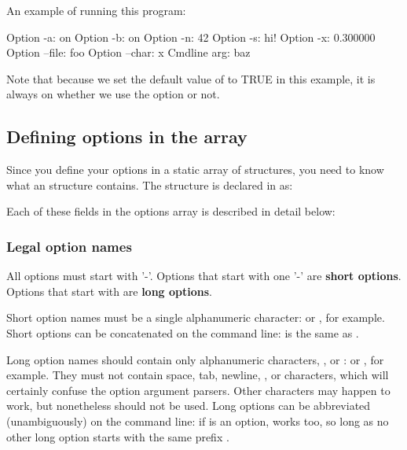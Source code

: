 An example of running this program:
\begin{cchunk}
  Option -a:      on
  Option -b:      on
  Option -n:      42
  Option -s:      hi!
  Option -x:      0.300000
  Option --file:  foo
  Option --char:  x
  Cmdline arg:    baz
\end{cchunk}

Note that because we set the default value of  to TRUE in
this example, it is always on whether we use the  option or
not.



\subsection{Defining options in the  array}

Since you define your options in a static array of
 structures, you need to know what an
 structure contains.  The 
structure is declared in  as:



Each of these fields in the options array is described in detail below:

   \subsubsection{Legal option names}

All options must start with '-'. Options that start with one '-' are
\textbf{short options}. Options that start with \ccode{--} are
\textbf{long options}.

Short option names must be a single alphanumeric character: 
or , for example.  Short options can be concatenated on the
command line:  is the same as .

Long option names should contain only alphanumeric characters,
\ccode{-}, or \ccode{\_}:  or , for
example. They must not contain space, tab, newline, \ccode{=}, or
\ccode{,} characters, which will certainly confuse the option argument
parsers. Other characters may happen to work, but nonetheless should
not be used. Long options can be abbreviated (unambiguously) on the
command line: if  is an option,  works too,
so long as no other long option starts with the same prefix
.

